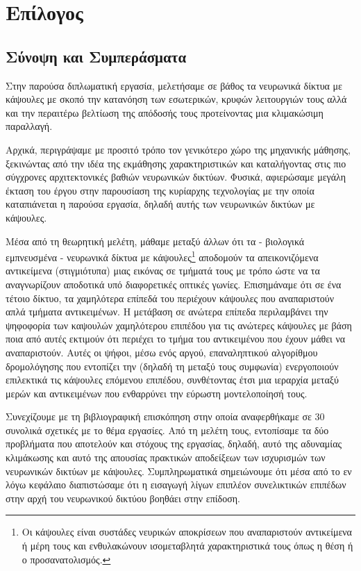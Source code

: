 \chapter{Επίλογος}

\section{Σύνοψη και Συμπεράσματα}

Στην παρούσα διπλωματική εργασία, μελετήσαμε σε βάθος τα νευρωνικά δίκτυα με κάψουλες με σκοπό την κατανόηση των εσωτερικών, κρυφών λειτουργιών τους αλλά και την περαιτέρω βελτίωση της απόδοσής τους προτείνοντας μια κλιμακώσιμη παραλλαγή.\par

Αρχικά, περιγράψαμε με προσιτό τρόπο τον γενικότερο χώρο της μηχανικής μάθησης, ξεκινώντας από την ιδέα της εκμάθησης χαρακτηριστικών και καταλήγοντας στις πιο σύγχρονες αρχιτεκτονικές βαθιών νευρωνικών δικτύων. Φυσικά, αφιερώσαμε μεγάλη έκταση του έργου στην παρουσίαση της κυρίαρχης τεχνολογίας με την οποία καταπιάνεται η παρούσα εργασία, δηλαδή αυτής των νευρωνικών δικτύων με κάψουλες.\par

Μέσα από τη θεωρητική μελέτη, μάθαμε μεταξύ άλλων ότι τα - βιολογικά εμπνευσμένα - νευρωνικά δίκτυα με κάψουλες\footnote{Οι κάψουλες είναι συστάδες νευρικών αποκρίσεων που αναπαριστούν αντικείμενα ή μέρη τους και ενθυλακώνουν ισομεταβλητά χαρακτηριστικά τους όπως η θέση ή ο προσανατολισμός.} αποδομούν τα απεικονιζόμενα αντικείμενα (στιγμιότυπα) μιας εικόνας σε τμήματά τους με τρόπο ώστε να τα αναγνωρίζουν αποδοτικά υπό διαφορετικές οπτικές γωνίες. Επισημάναμε ότι σε ένα τέτοιο δίκτυο, τα χαμηλότερα επίπεδά του περιέχουν κάψουλες που αναπαριστούν απλά τμήματα αντικειμένων. Η μετάβαση σε ανώτερα επίπεδα περιλαμβάνει την ψηφοφορία των καψουλών χαμηλότερου επιπέδου για τις ανώτερες κάψουλες με βάση ποια από αυτές εκτιμούν ότι περιέχει το τμήμα του αντικειμένου που έχουν μάθει να αναπαριστούν. Αυτές οι ψήφοι, μέσω ενός αργού, επαναληπτικού αλγορίθμου δρομολόγησης που εντοπίζει την  (δηλαδή τη μεταξύ τους συμφωνία) ενεργοποιούν επιλεκτικά τις κάψουλες επόμενου επιπέδου, συνθέτοντας έτσι μια ιεραρχία μεταξύ μερών και αντικειμένων που ενθαρρύνει την εύρωστη μοντελοποίησή τους.\par

Συνεχίζουμε με τη βιβλιογραφική επισκόπηση στην οποία αναφερθήκαμε σε 30 συνολικά σχετικές με το θέμα εργασίες. Από τη μελέτη τους, εντοπίσαμε τα δύο προβλήματα που αποτελούν και στόχους της εργασίας, δηλαδή, αυτό της αδυναμίας κλιμάκωσης και αυτό της απουσίας πρακτικών αποδείξεων των ισχυρισμών των νευρωνικών δικτύων με κάψουλες. Συμπληρωματικά σημειώνουμε ότι μέσα από το εν λόγω κεφάλαιο διαπιστώσαμε ότι η εισαγωγή λίγων επιπλέον συνελικτικών επιπέδων στην αρχή του νευρωνικού δικτύου βοηθάει στην επίδοση.\par

